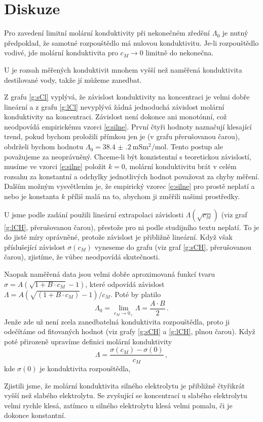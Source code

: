 \section*{Diskuze}
Pro zavedení limitní molární konduktivity při nekonečném zředění $\Lambda_0$ je nutný předpoklad, že samotné rozpouštědlo má nulovou konduktivitu.
Je-li rozpouštědlo vodivé, jde molární konduktivita pro $c_M \to 0$ limitně do nekonečna.

U  je rozsah měřených konduktivit mnohem vyšší než naměřená konduktivita destilované vody, takže jí můžeme zanedbat.


Z grafu \ref{g:sCl} vyplývá, že závislost konduktivity  na koncentraci je velmi dobře lineární a z grafu \ref{g:lCl} nevyplývá žádná jednoduchá závislost molární konduktivity na koncentraci.
Závislost není dokonce ani monotónní, což neodpovídá empirickému vzorci \eqref{e:silne}.
První čtyři hodnoty naznačují klesající trend, pokud bychom proložili přímkou jen je (v grafu přerušovanou čarou), obdrželi bychom hodnotu $\Lambda_0=\SI{38.4(2)}{\milli\siemens\metre\squared\per\mole}$. Tento postup ale považujeme za neoprávněný.
Chceme-li být konzistentní s teoretickou závislostí, musíme ve vzorci \eqref{e:silne} položit $k=0$, molární konduktivitu brát v celém rozsahu za konstantní a odchylky jednotlivých hodnot považovat za chyby měření.
Dalším možným vysvětlením je, že empirický vzorec \eqref{e:silne} pro  prostě neplatí a nebo je konstanta $k$ příliš malá na to, abychom ji změřili našimi prostředky.


U  jsme podle zadání použili lineární extrapolaci závislosti $\Lambda(\sqrt{c_M})$ (viz graf \ref{g:lCH}, přerušovanou čarou), přestože pro ni podle studijního textu neplatí.
To je do jisté míry oprávněné, protože závislost je přibližně lineární.
Když však příslušející závislost $\sigma(c_M)$ vyneseme do grafu (viz graf \ref{g:sCH}, přerušovanou čarou), zjistíme, že vůbec neodpovídá skutečnosti.

Naopak naměřená data jsou velmi dobře aproximovaná funkcí tvaru $\sigma = A(\sqrt{1+B\cdot c_M}-1)$, které odpovídá závislost $\Lambda=A(\sqrt{(1+B\cdot c_M)}-1)/c_M$. Poté by platilo
\begin{equation}
\Lambda_0=\lim_{c_M \to 0_+} \Lambda = \frac{A\cdot B}{2} \,.
\end{equation}
Jenže zde už není zcela zanedbatelná konduktivita rozpouštědla, proto ji odečítáme od fitovaných hodnot (viz grafy \ref{g:sCH} a \ref{g:lCH}, plnou čarou).
Když poté přirozeně upravíme definici molární konduktivity
\begin{equation*}
\Lambda=\frac{\sigma(c_M)-\sigma(0)}{c_M} \,,
\end{equation*}
kde $\sigma(0)$ je konduktivita rozpouštědla, 



Zjistili jsme, že molární konduktivita silného elektrolytu je přibližně čtyřikrát vyšší než slabého elektrolytu.
Se zvyšující se koncentrací u slabého elektrolytu velmi rychle klesá, zatímco u silného elektrolytu klesá velmi pomalu, či je dokonce konstantní.